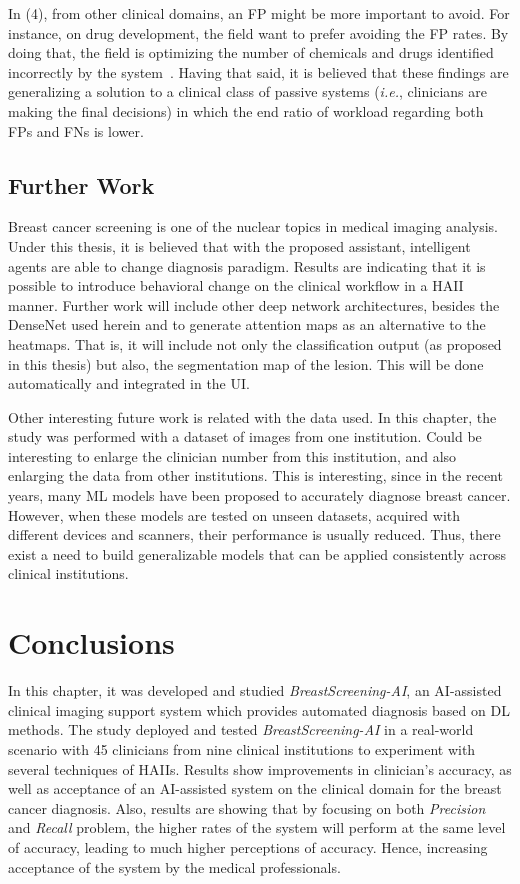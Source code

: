 In (4), from other clinical domains, an \ac{FP} might be more important to avoid.
For instance, on drug development, the field want to prefer avoiding the \ac{FP} rates.
By doing that, the field is optimizing the number of chemicals and drugs identified incorrectly by the system~\cite{raja2017machine}.
Having that said, it is believed that these findings are generalizing a solution to a clinical class of passive systems ({\it i.e.}, clinicians are making the final decisions) in which the end ratio of workload regarding both \acp{FP} and \acp{FN} is lower.

\subsection{Further Work}
\label{sec:app002007004}

Breast cancer screening is one of the nuclear topics in medical imaging analysis.
Under this thesis, it is believed that with the proposed assistant, intelligent agents are able to change diagnosis paradigm.
Results are indicating that it is possible to introduce behavioral change on the clinical workflow in a \ac{HAII} manner.
Further work will include other deep network architectures, besides the DenseNet used herein and to generate attention maps as an alternative to the heatmaps.
That is, it will include not only the classification output (as proposed in this thesis) but also, the segmentation map of the lesion.
This will be done automatically and integrated in the \ac{UI}.

Other interesting future work is related with the data used. 
In this chapter, the study was performed with a dataset of images from one institution.
Could be interesting to enlarge the clinician number from this institution, and also enlarging the data from other institutions.
This is interesting, since in the recent years, many \ac{ML} models have been proposed to accurately diagnose breast cancer.
However, when these models are tested on unseen datasets, acquired with different devices and scanners, their performance is usually reduced.
Thus, there exist a need to build generalizable models that can be applied consistently across clinical institutions.

\section{Conclusions}
\label{sec:app002008}

In this chapter, it was developed and studied {\it BreastScreening-AI}, an \ac{AI}-assisted clinical imaging support system which provides automated diagnosis based on \ac{DL} methods.
The study deployed and tested {\it BreastScreening-AI} in a real-world scenario with 45 clinicians from nine clinical institutions to experiment with several techniques of \acp{HAII}.
Results show improvements in clinician’s accuracy, as well as acceptance of an \ac{AI}-assisted system on the clinical domain for the breast cancer diagnosis.
Also, results are showing that by focusing on both {\it Precision} and {\it Recall} problem, the higher rates of the system will perform at the same level of accuracy, leading to much higher perceptions of accuracy.
Hence, increasing acceptance of the system by the medical professionals.

